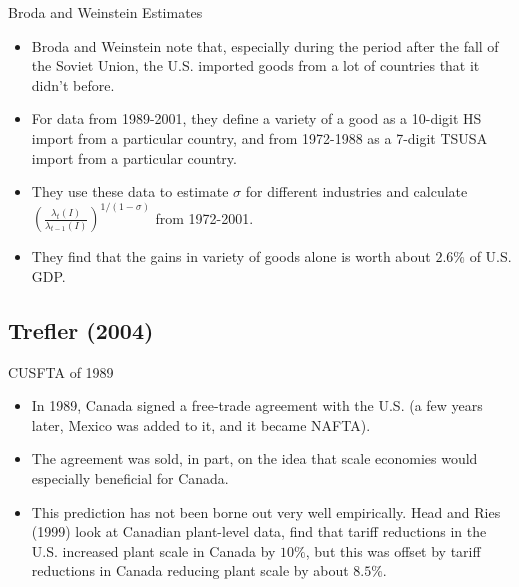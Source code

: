 \documentclass[aspectratio=169]{beamer}
\begin{document}

\begin{frame}{Broda and Weinstein Estimates}

\begin{itemize}
    \item<1-> Broda and Weinstein note that, especially during the period after the fall of the Soviet Union, the U.S. imported goods from a lot of countries that it didn’t before.
    \item<2-> For data from 1989-2001, they define a variety of a good as a 10-digit HS import from a particular country, and from 1972-1988 as a 7-digit TSUSA import from a particular country.
    \item<3-> They use these data to estimate $ \sigma $ for different industries and calculate $ \left( \frac{\lambda_{t}\left( I \right)}{\lambda_{t-1}\left( I \right)} \right)^{1 / \left( 1 - \sigma \right)} $ from 1972-2001.
    \item<4-> They find that the gains in variety of goods alone is worth about $ 2.6\% $ of U.S. GDP.
\end{itemize}
    
\end{frame}


\subsection{Trefler (2004)}


\begin{frame}{CUSFTA of 1989}

\begin{itemize}
    \item<1-> In 1989, Canada signed a free-trade agreement with the U.S. (a few years later, Mexico was added to it, and it became NAFTA).
    \item<2-> The agreement was sold, in part, on the idea that scale economies would especially beneficial for Canada.
    \item<3-> This prediction has not been borne out very well empirically.  Head and Ries (1999) look at Canadian plant-level data, find that tariff reductions in the U.S. increased plant scale in Canada by $ 10\% $, but this was offset by tariff reductions in Canada reducing plant scale by about $ 8.5\% $. 
\end{itemize}
    
\end{frame}
\end{document}
